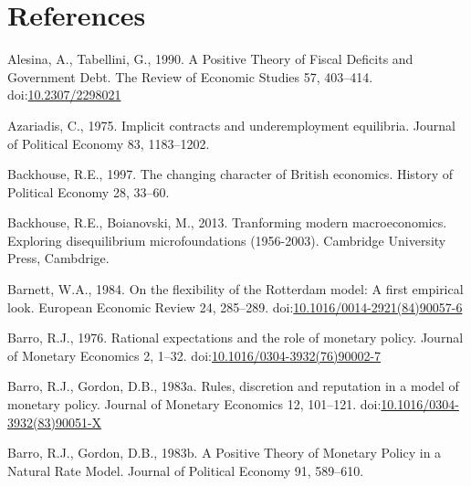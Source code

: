 \documentclass[
  12pt,
  onecolumn]{article}
\newlength{\cslhangindent}
\newlength{\cslentryspacingunit} %
\newenvironment{CSLReferences}[2] %
 {%
  \setlength{\parindent}{0pt}
  \ifodd #1
  \let\oldpar\par
  \def\par{\hangindent=\cslhangindent\oldpar}
  \fi
  \setlength{\parskip}{#2\cslentryspacingunit}
 }%
 {}
\begin{document}
\newpage

\hypertarget{references}{%
\section*{References}\label{references}}

\hypertarget{refs}{}
\begin{CSLReferences}{1}{0}
\leavevmode{}%
Alesina, A., Tabellini, G., 1990. A {Positive Theory} of {Fiscal
Deficits} and {Government Debt}. The Review of Economic Studies 57,
403--414. doi:\href{https://doi.org/10.2307/2298021}{10.2307/2298021}

\leavevmode{}%
Azariadis, C., 1975. Implicit contracts and underemployment equilibria.
Journal of Political Economy 83, 1183--1202.

\leavevmode{}%
Backhouse, R.E., 1997. The changing character of {British} economics.
History of Political Economy 28, 33--60.

\leavevmode{}%
Backhouse, R.E., Boianovski, M., 2013. Tranforming modern
macroeconomics. {Exploring} disequilibrium microfoundations (1956-2003).
{Cambridge University Press}, {Cambdrige}.

\leavevmode{}%
Barnett, W.A., 1984. On the flexibility of the {Rotterdam} model: {A}
first empirical look. European Economic Review 24, 285--289.
doi:\href{https://doi.org/10.1016/0014-2921(84)90057-6}{10.1016/0014-2921(84)90057-6}

\leavevmode{}%
Barro, R.J., 1976. Rational expectations and the role of monetary
policy. Journal of Monetary Economics 2, 1--32.
doi:\href{https://doi.org/10.1016/0304-3932(76)90002-7}{10.1016/0304-3932(76)90002-7}

\leavevmode{}%
Barro, R.J., Gordon, D.B., 1983a. Rules, discretion and reputation in a
model of monetary policy. Journal of Monetary Economics 12, 101--121.
doi:\href{https://doi.org/10.1016/0304-3932(83)90051-X}{10.1016/0304-3932(83)90051-X}

\leavevmode{}%
Barro, R.J., Gordon, D.B., 1983b. A {Positive Theory} of {Monetary
Policy} in a {Natural Rate Model}. Journal of Political Economy 91,
589--610.


\end{CSLReferences}
\end{document}
